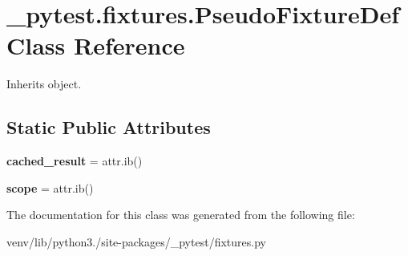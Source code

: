 \hypertarget{class__pytest_1_1fixtures_1_1_pseudo_fixture_def}{}\section{\+\_\+pytest.\+fixtures.\+Pseudo\+Fixture\+Def Class Reference}
\label{class__pytest_1_1fixtures_1_1_pseudo_fixture_def}


Inherits object.

\subsection*{Static Public Attributes}
\begin{DoxyCompactItemize}
\item 
\mbox{\label{class__pytest_1_1fixtures_1_1_pseudo_fixture_def_a698f6623fef0382149b1f47e5419e1f1}} 
{\bfseries cached\+\_\+result} = attr.\+ib()
\item 
\mbox{\label{class__pytest_1_1fixtures_1_1_pseudo_fixture_def_af86b70a572427173fb4c6911945567ca}} 
{\bfseries scope} = attr.\+ib()
\end{DoxyCompactItemize}


The documentation for this class was generated from the following file\+:\begin{DoxyCompactItemize}
\item 
venv/lib/python3./site-\/packages/\+\_\+pytest/fixtures.\+py\end{DoxyCompactItemize}
